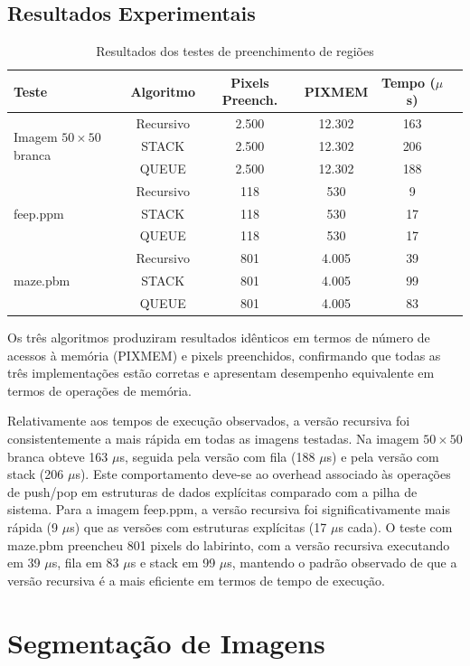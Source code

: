 \documentclass[12pt,a4paper]{article}
\begin{document}
\subsection{Resultados Experimentais}
\begin{table}[h]
\begin{tabular}{|l|c|c|c|c|c|}
\hline
\textbf{Teste} & \textbf{Algoritmo} & \textbf{Pixels Preench.} & \textbf{PIXMEM} & \textbf{Tempo ($\mu$s)}\\
\hline
\multirow{3}{*}{Imagem $50 \times 50$ branca} & Recursivo & 2.500 & 12.302 & 163 \\
 & STACK & 2.500 & 12.302 & 206 \\
 & QUEUE & 2.500 & 12.302 & 188 \\
\hline
\multirow{3}{*}{feep.ppm} & Recursivo & 118 & 530 & 9 \\
 & STACK & 118 & 530 & 17 \\
 & QUEUE & 118 & 530 & 17 \\
\hline
\multirow{3}{*}{maze.pbm} & Recursivo & 801 & 4.005 & 39 \\
 & STACK & 801 & 4.005 & 99 \\
 & QUEUE & 801 & 4.005 & 83 \\
\hline
\end{tabular}
\caption{Resultados dos testes de preenchimento de regiões}
\end{table}
Os três algoritmos produziram resultados idênticos em termos de número de acessos à memória (PIXMEM) e pixels preenchidos, confirmando que todas as três implementações estão corretas e apresentam desempenho equivalente em termos de operações de memória.

Relativamente aos tempos de execução observados, a versão recursiva foi consistentemente a mais rápida em todas as imagens testadas. Na imagem $50 \times 50$ branca obteve 163 $\mu$s, seguida pela versão com fila (188 $\mu$s) e pela versão com stack (206 $\mu$s). Este comportamento deve-se ao overhead associado às operações de push/pop em estruturas de dados explícitas comparado com a pilha de sistema. Para a imagem feep.ppm, a versão recursiva foi significativamente mais rápida (9 $\mu$s) que as versões com estruturas explícitas (17 $\mu$s cada). O teste com maze.pbm preencheu 801 pixels do labirinto, com a versão recursiva executando em 39 $\mu$s, fila em 83 $\mu$s e stack em 99 $\mu$s, mantendo o padrão observado de que a versão recursiva é a mais eficiente em termos de tempo de execução.

\section{Segmentação de Imagens}
\end{document}
